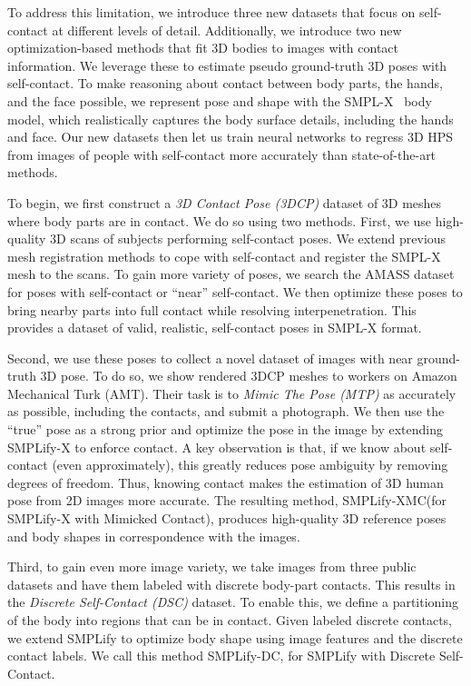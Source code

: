 \documentclass[final]{cvpr}
\newcommand{\smplifyxmc}{\mbox{SMPLify-XMC}\xspace}
\newcommand{\smplifyxdc}{\mbox{SMPLify-DC}\xspace}
\theoremstyle{definition}
\begin{document}
To address this limitation, we introduce three new datasets that focus on self-contact at different levels of detail.
Additionally, we introduce two new optimization-based methods that fit 3D bodies to images with contact information.
We leverage these to estimate pseudo ground-truth 3D poses with self-contact.
To make reasoning about contact between body parts, the hands, and the face possible, we represent pose and shape with the SMPL-X~\cite{SMPL-X:2019} body model, which realistically captures the body surface details, including the hands and face.
Our new datasets then let us train neural networks to regress 3D HPS from images of people with self-contact more accurately than state-of-the-art methods.

To begin,  we first construct a {\em 3D Contact Pose (3DCP)} dataset of 3D meshes where body parts are in contact.
We do so using two methods. 
First, we use high-quality 3D scans of subjects performing self-contact poses. We extend previous mesh registration methods to cope with self-contact and register the SMPL-X mesh to the scans. 
To gain more variety of poses, we search the AMASS dataset \cite{AMASS:2019} for poses with self-contact or ``near'' self-contact. We then optimize these poses to bring nearby parts into full contact while resolving interpenetration. This provides a dataset of valid, realistic, self-contact poses in SMPL-X format.

Second, we use these poses to collect a novel dataset of images with near ground-truth 3D pose. 
To do so, we show rendered 3DCP meshes to workers on Amazon Mechanical Turk (AMT).
Their task is to {\em Mimic The Pose (MTP)} as accurately as possible, including the contacts, and submit a photograph.
We then use the ``true'' pose as a strong prior and optimize the pose in the image by extending SMPLify-X \cite{SMPL-X:2019} to enforce contact.
A key observation is that, if we know about self-contact (even approximately), this greatly reduces pose ambiguity by removing degrees of freedom. 
Thus, knowing contact makes the estimation of 3D human pose from 2D images more accurate.
The resulting method,  \smplifyxmc (for SMPLify-X with Mimicked Contact), produces high-quality 3D reference poses and body shapes in correspondence with the images.

Third, to gain even more image variety, we take images from three public datasets \cite{Johnson10,Johnson11,liuLQWTcvpr16DeepFashion} and have them labeled with discrete body-part contacts. 
This results in the {\em Discrete Self-Contact (DSC)} dataset.
To enable this, we define a partitioning of the body into regions that can be in contact.
Given labeled discrete contacts, we extend SMPLify to optimize body shape using image features and the discrete contact labels. 
We call this method \smplifyxdc, for SMPLify with Discrete Self-Contact.
\end{document}
